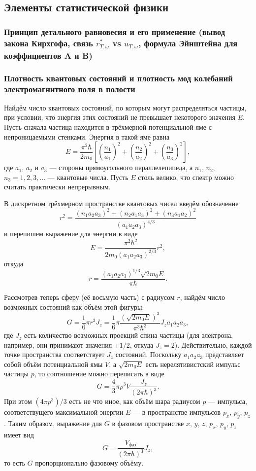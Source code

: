 \subsection{Элементы статистической физики}
\subsubsection{Принцип детального равновесия и его применение (вывод закона Кирхгофа, связь $r_{T, \omega}^*$ vs $u_{T, \omega}$, формула Эйнштейна для коэффициентов A и B)}


\subsubsection{Плотность квантовых состояний и плотность мод колебаний электромагнитного поля в полости}
Найдём число квантовых состояний, по которым могут распределяться частицы, при
условии, что энергия этих состояний не превышает некоторого значения $ E $.
Пусть сначала частица находится в трёхмерной потенциальной яме с непроницаемыми
стенками. Энергия в такой яме равна 
\[
    E = \frac{\pi^2\hbar}{2m_0} \left[ \left( \frac{n_1}{a_1} \right)^2 + \left(
    \frac{n_2}{a_2}\right)^2 + \left( \frac{n_3}{a_3} \right)^2   \right],
\]
где $ a_1 $, $ a_2 $ и $ a_3 $ --- стороны прямоугольного параллелепипеда, а $
n_1 $, $ n_2 $, $ n_3 = 1, 2, 3,\ldots$ --- квантовые числа. Пусть $ E $ столь
велико, что спектр можно считать практически непрерывным.

В дискретном трёхмерном пространстве квантовых чисел введём обозначение  
\[
  r^2 = \frac{(n_1a_2a_3)^2 + (n_2a_1a_3)^2 + (n_3a_1a_2)^2}{(a_1a_2a_3)^{4/3}}
\]
и перепишем выражение для энергии в виде 
\[
  E = \frac{\pi^2\hbar^2}{2m_0(a_1a_2a_3)^{2/3}}r^2,
\]
откуда 
\[
  r = \frac{(a_1a_2a_3)^{1/3}\sqrt{2m_0E}}{\pi\hbar}.
\]

Рассмотрев теперь сферу (её восьмую часть) с радиусом $ r $, найдём число
возможных состояний как объём этой фигуры:
\[
  G = \frac{1}{6}\pi r^3 J_z = \frac{1}{6} \pi \frac{ \left( \sqrt{2m_0E}
  \right)^3 }{\pi^3\hbar^3}J_z a_1a_2a_3,
\]
где $ J_z $ есть количество возможных проекций спина частицы (для электрона,
например, они принимают значения $ \pm 1/2 $, откуда $ J_z = 2 $).
Действительно, каждой точке пространства соответствует $ J_z $ состояний.
Поскольку $ a_1a_2a_3 $ представляет собой объём потенциальной ямы $ V $, а $
\sqrt{2m_0E} $ есть нерелятивистский импульс частицы $ p $, то соотношение можно
переписать в виде 
\[
    G = \frac{4}{3} \pi \rho^3 V \frac{J_z}{(2\pi\hbar)^3}.
\]
При этом $ (4\pi p^3)/3 $ есть не что иное, как объём шара радиусом $ p $
--- импульса, соответствущего максимальной энергии $ E $ --- в пространстве
импульсов $ p_x $, $ p_y $, $ p_z $. Таким образом, выражение для $ G $ в
фазовом пространстве $ x $, $ y $, $ z $, $ p_x $, $ p_y $, $ p_z $ имеет вид 
\[
  G = \frac{V_{\text{фаз}}}{(2\pi \hbar)^3} J_z,
\]
то есть $ G $ пропорционально фазовому объёму.

